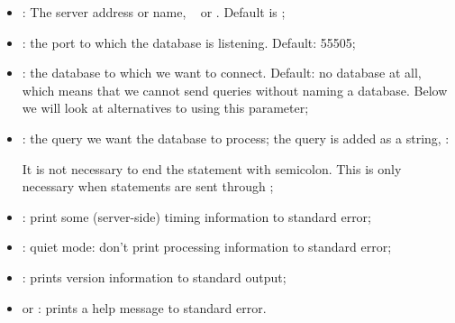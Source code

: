 \begin{itemize}
\item {}:
The server address or name, \eg\  or
. Default is ;

\item {}:
the port to which the database is listening. Default: 55505;

\item {}:
the database to which we want to connect. 
Default: no database at all, which means
that we cannot send queries without naming a database.
Below we will look at alternatives to using this parameter;

\item {}:
the query we want the database to process;
the query is added as a string, \eg:


It is not necessary to end the statement with semicolon.
This is only necessary when statements are sent through
;

\item {}:
print some (server-side) timing information to standard error;

\item {}:
quiet mode: don't print processing information to standard error;

\item {}: prints version information to standard output;
\item {} or : prints a help message to standard error.
\end{itemize}

